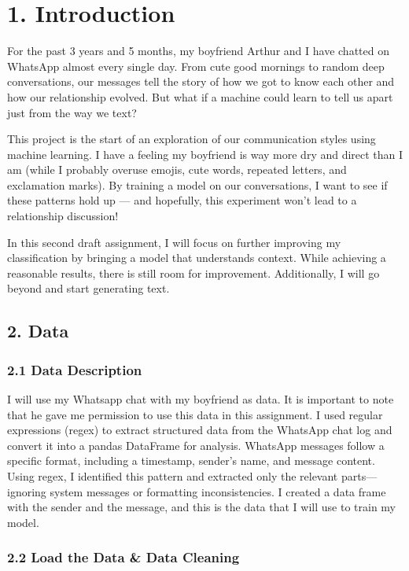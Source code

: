 \documentclass[11pt]{article}
\begin{document}
\section{1. Introduction}\label{introduction}

For the past 3 years and 5 months, my boyfriend Arthur and I have
chatted on WhatsApp almost every single day. From cute good mornings to
random deep conversations, our messages tell the story of how we got to
know each other and how our relationship evolved. But what if a machine
could learn to tell us apart just from the way we text?

This project is the start of an exploration of our communication styles
using machine learning. I have a feeling my boyfriend is way more dry
and direct than I am (while I probably overuse emojis, cute words,
repeated letters, and exclamation marks). By training a model on our
conversations, I want to see if these patterns hold up --- and
hopefully, this experiment won't lead to a relationship discussion!

In this second draft assignment, I will focus on further improving my
classification by bringing a model that understands context. While
achieving a reasonable results, there is still room for improvement.
Additionally, I will go beyond and start generating text.

    \subsection{2. Data}\label{data}

\subsubsection{2.1 Data Description}\label{data-description}

I will use my Whatsapp chat with my boyfriend as data. It is important
to note that he gave me permission to use this data in this assignment.
I used regular expressions (regex) to extract structured data from the
WhatsApp chat log and convert it into a pandas DataFrame for analysis.
WhatsApp messages follow a specific format, including a timestamp,
sender's name, and message content. Using regex, I identified this
pattern and extracted only the relevant parts---ignoring system messages
or formatting inconsistencies. I created a data frame with the sender
and the message, and this is the data that I will use to train my model.

    \subsubsection{2.2 Load the Data \& Data
Cleaning}\label{load-the-data-data-cleaning}
\end{document}
